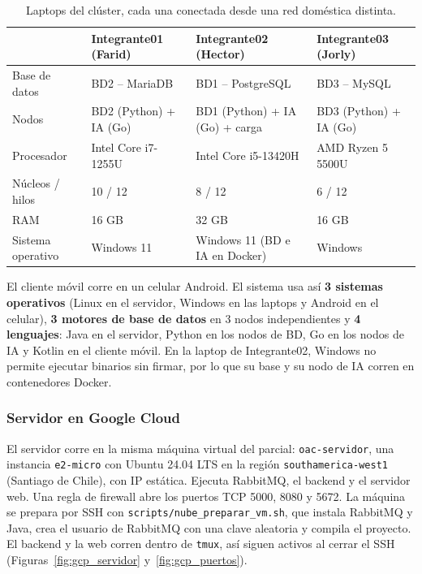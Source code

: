 \documentclass[10pt,a4paper]{article}
\begin{document}
\begin{table}[H]
\centering
\small
\begin{tabularx}{\textwidth}{p{2.6cm}XXX}
\toprule
 & \textbf{Integrante01 (Farid)} & \textbf{Integrante02 (Hector)} & \textbf{Integrante03 (Jorly)} \\
\midrule
Base de datos & BD2 -- MariaDB & BD1 -- PostgreSQL & BD3 -- MySQL \\
Nodos & BD2 (Python) + IA (Go) & BD1 (Python) + IA (Go) + carga & BD3 (Python) + IA (Go) \\
Procesador & Intel Core i7-1255U & Intel Core i5-13420H & AMD Ryzen 5 5500U \\
Núcleos / hilos & 10 / 12 & 8 / 12 & 6 / 12 \\
RAM & 16 GB & 32 GB & 16 GB \\
Sistema operativo & Windows 11 & Windows 11 (BD e IA en Docker) & Windows \\
\bottomrule
\end{tabularx}
\caption{Laptops del clúster, cada una conectada desde una red doméstica distinta.}
\label{tab:montaje}
\end{table}

El cliente móvil corre en un celular Android. El sistema usa así \textbf{3 sistemas operativos}
(Linux en el servidor, Windows en las laptops y Android en el celular), \textbf{3 motores de base de
datos} en 3 nodos independientes y \textbf{4 lenguajes}: Java en el servidor, Python en los nodos de
BD, Go en los nodos de IA y Kotlin en el cliente móvil. En la laptop de Integrante02, Windows no permite
ejecutar binarios sin firmar, por lo que su base y su nodo de IA corren en contenedores Docker.

\subsubsection{Servidor en Google Cloud}

El servidor corre en la misma máquina virtual del parcial: \texttt{oac-servidor}, una instancia
\texttt{e2-micro} con Ubuntu 24.04 LTS en la región \texttt{southamerica-west1} (Santiago de Chile),
con IP estática. Ejecuta RabbitMQ, el backend y el servidor web. Una regla de firewall abre los puertos
TCP 5000, 8080 y 5672. La máquina se prepara por SSH con \texttt{scripts/nube\_preparar\_vm.sh}, que
instala RabbitMQ y Java, crea el usuario de RabbitMQ con una clave aleatoria y compila el proyecto. El
backend y la web corren dentro de \texttt{tmux}, así siguen activos al cerrar el SSH
(Figuras~\ref{fig:gcp_servidor} y~\ref{fig:gcp_puertos}).
\end{document}

